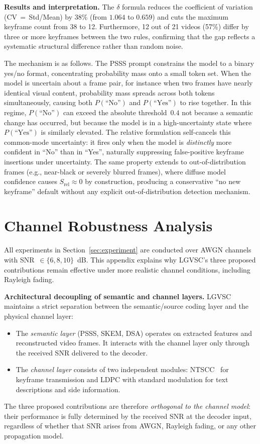 \documentclass[10pt,journal]{IEEEtran}
\begin{document}
\textbf{Results and interpretation.}
The $\delta$ formula reduces the coefficient of variation (CV\,$=$\,Std/Mean) by 38\% (from $1.064$ to $0.659$) and cuts the maximum keyframe count from 38 to 12. Furthermore, 12 out of 21 videos (57\%) differ by three or more keyframes between the two rules, confirming that the gap reflects a systematic structural difference rather than random noise.

The mechanism is as follows. The PSSS prompt constrains the model to a binary yes/no format, concentrating probability mass onto a small token set. When the model is uncertain about a frame pair, for instance when two frames have nearly identical visual content, probability mass spreads across both tokens simultaneously, causing both $P(\text{``No''})$ and $P(\text{``Yes''})$ to rise together. In this regime, $P(\text{``No''})$ can exceed the absolute threshold~$0.4$ not because a semantic change has occurred, but because the model is in a high-uncertainty state where $P(\text{``Yes''})$ is similarly elevated. The relative formulation self-cancels this common-mode uncertainty: it fires only when the model is \emph{distinctly} more confident in ``No'' than in ``Yes'', naturally suppressing false-positive keyframe insertions under uncertainty. The same property extends to out-of-distribution frames (e.g., near-black or severely blurred frames), where diffuse model confidence causes $S_\mathrm{rel}\approx 0$ by construction, producing a conservative ``no new keyframe'' default without any explicit out-of-distribution detection mechanism.

\section{Channel Robustness Analysis}
\label{appendix:channel}

All experiments in Section~\ref{sec:experiment} are conducted over AWGN channels with SNR~$\in\{6,8,10\}$~dB. This appendix explains why LGVSC's three proposed contributions remain effective under more realistic channel conditions, including Rayleigh fading.

\textbf{Architectural decoupling of semantic and channel layers.}
LGVSC maintains a strict separation between the semantic/source coding layer and the physical channel layer:
\begin{itemize}
  \item The \emph{semantic layer} (PSSS, SKEM, DSA) operates on extracted features and reconstructed video frames. It interacts with the channel layer only through the received SNR delivered to the decoder.
  \item The \emph{channel layer} consists of two independent modules: NTSCC~\cite{NTSCC} for keyframe transmission and LDPC with standard modulation for text descriptions and side information.
\end{itemize}
The three proposed contributions are therefore \emph{orthogonal to the channel model}: their performance is fully determined by the received SNR at the decoder input, regardless of whether that SNR arises from AWGN, Rayleigh fading, or any other propagation model.
\end{document}
